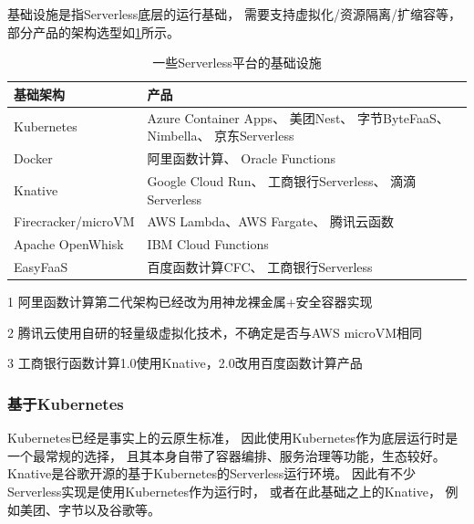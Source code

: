 基础设施是指Serverless底层的运行基础，
需要支持虚拟化/资源隔离/扩缩容等，
部分产品的架构选型如\cref{table:serverless-infras}所示。

\begin{table}[h!]
\centering
\begin{threeparttable}
    \begin{tabularx}{\textwidth}{|l|X|}
        \toprule
        \textbf{基础架构} & \textbf{产品} \\
        \midrule
        Kubernetes & Azure Container Apps\cite{azure_container_apps_ga}、
        美团Nest\cite{meituan_serverless_nest, meituan_serverless_2}、
        字节ByteFaaS\cite{bytedance_faas}、Nimbella\cite{nimbella_k8s}、
        京东Serverless\cite{jd_serverless, jd_serverless_2} \\
        \hline
        Docker & 阿里函数计算\cite{aliyun_faas_arch_2}\tnote{1}、
        Oracle Functions\cite{overview_oracle_functions} \\
        \hline
        Knative & Google Cloud Run\cite{gcr_knative}、
        工商银行Serverless\cite{icbc_faas_arch}\tnote{1}、
        滴滴Serverless\cite{didi_serverless}  \\
        \hline
        Firecracker/microVM & AWS Lambda、AWS Fargate\cite{firecracker_home}、
        腾讯云函数\cite{tecent_faas_cold_start, tecent_serverless}\tnote{2} \\
        \hline
        Apache OpenWhisk & IBM Cloud Functions\cite{how_ibm_cloud_functions_works} \\
        \hline
        EasyFaaS & 百度函数计算CFC\cite{baidu_serverless_arch}、
        工商银行Serverless\cite{icbc_faas_arch} \\
        \bottomrule
    \end{tabularx}
\begin{tablenotes}
    \item[1] {\footnotesize 阿里函数计算第二代架构已经改为用神龙裸金属+安全容器实现\cite{aliyun_faas_arch_2}}
    \item[2] {\footnotesize 腾讯云使用自研的轻量级虚拟化技术，不确定是否与AWS microVM相同}
    \item[3] {\footnotesize 工商银行函数计算1.0使用Knative，2.0改用百度函数计算产品}
\end{tablenotes}
\end{threeparttable}
\caption{一些Serverless平台的基础设施}
\label{table:serverless-infras}
\end{table}

\subsubsection{基于Kubernetes}
Kubernetes已经是事实上的云原生标准，
因此使用Kubernetes作为底层运行时是一个最常规的选择，
且其本身自带了容器编排、服务治理等功能，生态较好。
Knative是谷歌开源的基于Kubernetes的Serverless运行环境。
因此有不少Serverless实现是使用Kubernetes作为运行时，
或者在此基础之上的Knative，
例如美团、字节以及谷歌等。

